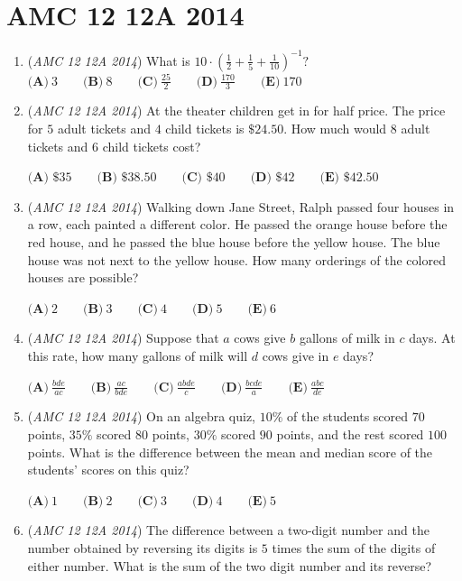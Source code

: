 \section{AMC 12 12A 2014}
        \begin{enumerate}
        	\item (\textit{AMC 12 12A 2014}) What is $10 \cdot \left(\frac{1}{2} + \frac{1}{5} + \frac{1}{10}\right)^{-1}?$
$\textbf{(A)}\ 3\qquad\textbf{(B)}\ 8\qquad\textbf{(C)}\ \frac{25}{2}\qquad\textbf{(D)}\ \frac{170}{3}\qquad\textbf{(E)}\ 170$


	\item (\textit{AMC 12 12A 2014}) At the theater children get in for half price.  The price for $5$ adult tickets and $4$ child tickets is $\$24.50$.  How much would $8$ adult tickets and $6$ child tickets cost?


 $\textbf{(A) }\$35\qquad \textbf{(B) }\$38.50\qquad \textbf{(C) }\$40\qquad \textbf{(D) }\$42\qquad \textbf{(E) }\$42.50$


	\item (\textit{AMC 12 12A 2014}) Walking down Jane Street, Ralph passed four houses in a row, each painted a different color. He passed the orange house before the red house, and he passed the blue house before the yellow house. The blue house was not next to the yellow house. How many orderings of the colored houses are possible?


 $\textbf{(A)}\ 2\qquad\textbf{(B)}\ 3\qquad\textbf{(C)}\ 4\qquad\textbf{(D)}\ 5\qquad\textbf{(E)}\ 6$


	\item (\textit{AMC 12 12A 2014}) Suppose that $a$ cows give $b$ gallons of milk in $c$ days. At this rate, how many gallons of milk will $d$ cows give in $e$ days?


 $\textbf{(A)}\ \frac{bde}{ac}\qquad\textbf{(B)}\ \frac{ac}{bde}\qquad\textbf{(C)}\ \frac{abde}{c}\qquad\textbf{(D)}\ \frac{bcde}{a}\qquad\textbf{(E)}\ \frac{abc}{de}$


	\item (\textit{AMC 12 12A 2014}) On an algebra quiz, $10\%$ of the students scored $70$ points, $35\%$ scored $80$ points, $30\%$ scored $90$ points, and the rest scored $100$ points. What is the difference between the mean and median score of the students' scores on this quiz?


 $\textbf{(A)}\ 1\qquad\textbf{(B)}\ 2\qquad\textbf{(C)}\ 3\qquad\textbf{(D)}\ 4\qquad\textbf{(E)}\ 5$


	\item (\textit{AMC 12 12A 2014}) The difference between a two-digit number and the number obtained by reversing its digits is $5$ times the sum of the digits of either number.  What is the sum of the two digit number and its reverse?



\end{enumerate}
